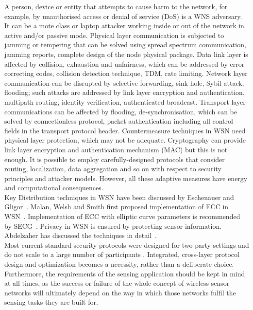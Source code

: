 \documentclass[conference,man]{IEEEtran}
\begin{document}
A person, device or entity that attempts to cause harm to the network, for example, by unauthorised access or denial of service (DoS) is a WNS adversary. It can be a mote class or laptop attacker working inside or out of the network in active and/or passive mode. Physical layer communication is subjected to jamming or tempering that can be solved using spread spectrum communication, jamming reports, complete design of the node physical package. Data link layer is affected by collision, exhaustion and unfairness, which can be addressed by error correcting codes, collision detection technique, TDM, rate limiting. Network layer communication can be disrupted by selective forwarding, sink hole, Sybil attack, flooding; such attacks are addressed by link layer encryption and authentication, multipath routing, identity verification, authenticated broadcast. Transport layer communications can be affected by flooding, de-synchronisation, which can be solved by connectionless protocol, packet authentication including all control fields in the transport protocol header. Countermeasure techniques in WSN need physical layer protection, which may not be adequate. Cryptography can provide link layer encryption and authentication mechanism (MAC) but this is not enough. It is possible to employ carefully-designed protocols that consider routing, localization, data aggregation and so on with respect to security principles and attacker models. However, all these adaptive measures have energy and computational consequences.\\

Key Distribution techniques in WSN have been discussed by Eschenauer and Gligor~\cite{Gig02}. Malan, Welsh and Smith first proposed implementation of ECC in WSN~\cite{Mws}. Implementation of ECC with elliptic curve parameters is recommended by SECG~\cite{Ning08}. Privacy in WSN is ensured by protecting sensor information. Abdelzaher has discussed the techniques in detail~\cite{He07}.\\







Most current standard security
protocols were designed for two-party settings
and do not scale to a large number of participants \cite{ShiPer04}.
Integrated, cross-layer protocol design 
and  optimization  becomes  a  necessity,  rather  than  a  deliberate  choice.    Furthermore,  the 
requirements of the sensing application should be kept in mind at all times, as the success or 
failure of the whole concept of wireless sensor networks will ultimately depend on the way in 
which those networks fulfil the sensing tasks they are built for. \\
 
\end{document}
